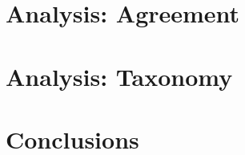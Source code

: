 \documentclass[11pt,a4paper]{article}
\begin{document}
\section{Analysis: Agreement}
\label{sec:analysis}


\section{Analysis: Taxonomy}
\label{sec:taxo}




\section{Conclusions}
\label{sec:conc}




%
\end{document}
